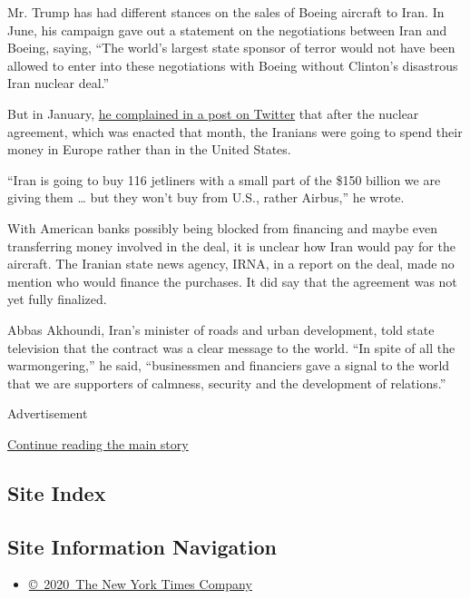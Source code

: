 Mr. Trump has had different stances on the sales of Boeing aircraft to
Iran. In June, his campaign gave out a statement on the negotiations
between Iran and Boeing, saying, ``The world's largest state sponsor of
terror would not have been allowed to enter into these negotiations with
Boeing without Clinton's disastrous Iran nuclear deal.''

But in January,
\href{https://twitter.com/realdonaldtrump/status/688743019479171072?lang=en}{he
complained in a post on Twitter} that after the nuclear agreement, which
was enacted that month, the Iranians were going to spend their money in
Europe rather than in the United States.

``Iran is going to buy 116 jetliners with a small part of the \$150
billion we are giving them \ldots{} but they won't buy from U.S., rather
Airbus,'' he wrote.

With American banks possibly being blocked from financing and maybe even
transferring money involved in the deal, it is unclear how Iran would
pay for the aircraft. The Iranian state news agency, IRNA, in a report
on the deal, made no mention who would finance the purchases. It did say
that the agreement was not yet fully finalized.

Abbas Akhoundi, Iran's minister of roads and urban development, told
state television that the contract was a clear message to the world.
``In spite of all the warmongering,'' he said, ``businessmen and
financiers gave a signal to the world that we are supporters of
calmness, security and the development of relations.''

Advertisement

\protect\hyperlink{after-bottom}{Continue reading the main story}

\hypertarget{site-index}{%
\subsection{Site Index}\label{site-index}}

\hypertarget{site-information-navigation}{%
\subsection{Site Information
Navigation}\label{site-information-navigation}}

\begin{itemize}
\tightlist
\item
  \href{https://help.nytimes3xbfgragh.onion/hc/en-us/articles/115014792127-Copyright-notice}{©~2020~The
  New York Times Company}
\end{itemize}

